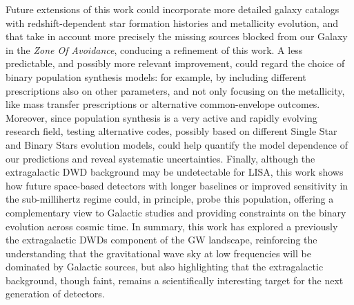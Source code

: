 Future extensions of this work could incorporate more detailed galaxy catalogs with redshift-dependent star formation histories and metallicity evolution, and that take in account more precisely the missing sources blocked from our Galaxy in the \textit{Zone Of Avoidance}, conducing a refinement of this work.
A less predictable, and possibly more relevant improvement, could regard the choice of binary population synthesis models: for example, by including different prescriptions also on other parameters, and not only focusing on the metallicity, like mass transfer prescriptions or alternative common-envelope outcomes.
Moreover, since population synthesis is a very active and rapidly evolving research field, testing alternative codes, possibly based on different Single Star and Binary Stars evolution models, could help quantify the model dependence of our predictions and reveal systematic uncertainties.
Finally, although the extragalactic DWD background may be undetectable for LISA, this work shows how future space-based detectors with longer baselines or improved sensitivity in the sub-millihertz regime could, in principle, probe this population, offering a complementary view to Galactic studies and providing constraints on the binary evolution across cosmic time.
In summary, this work has explored a previously the extragalactic DWDs component of the GW landscape, reinforcing the understanding that the gravitational wave sky at low frequencies will be dominated by Galactic sources, but also highlighting that the extragalactic background, though faint, remains a scientifically interesting target for the next generation of detectors.

